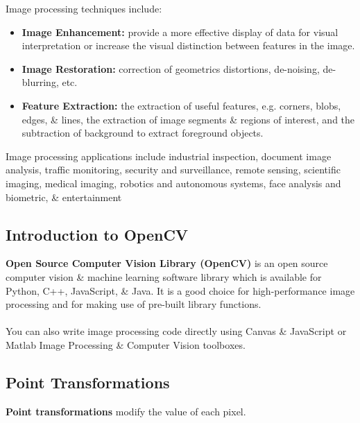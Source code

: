 \documentclass[a4paper,11pt]{article}
\begin{document}
Image processing techniques include:
\begin{itemize}
    \item   \textbf{Image Enhancement:} provide a more effective display of data for visual interpretation or increase the visual distinction between features in the image.
    \item   \textbf{Image Restoration:} correction of geometrics distortions, de-noising, de-blurring, etc.
    \item   \textbf{Feature Extraction:} the extraction of useful features, e.g. corners, blobs, edges, \& lines, the extraction of image segments \& regions of interest, and the subtraction of background to extract foreground objects.
\end{itemize}

Image processing applications include industrial inspection, document image analysis, traffic monitoring, security and surveillance, remote sensing, scientific imaging, medical imaging, robotics and autonomous systems, face analysis and biometric, \& entertainment  

\subsection{Introduction to OpenCV}
\textbf{Open Source Computer Vision Library (OpenCV)} is an open source computer vision \& machine learning software library which is available for Python, C++, JavaScript, \& Java.
It is a good choice for high-performance image processing and for making use of pre-built library functions.
\\\\
You can also write image processing code directly using Canvas \& JavaScript or Matlab Image Processing \& Computer Vision toolboxes.

\subsection{Point Transformations}
\textbf{Point transformations} modify the value of each pixel.
\end{document}
